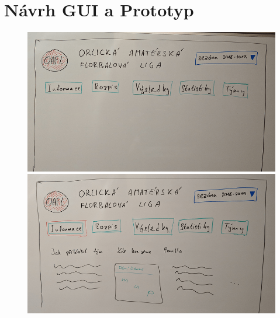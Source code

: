 \documentclass[11pt, a4paper, titlepage]{article}
\begin{document}

\newpage

\section{Návrh GUI a Prototyp}

\begin{figure}[htp]
\centering
    \begin{minipage}{.5\textwidth}
        \centering
        \includegraphics[width=.98\textwidth]{images/draft-01.png}
    \end{minipage}%
    \begin{minipage}{.5\textwidth}
        \centering
        \includegraphics[width=.98\textwidth]{images/draft-02.png}
    \end{minipage}
\end{figure}
\end{document}
